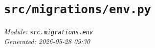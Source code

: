 
\section{\texttt{src/migrations/env.py}}
\textit{Module: \texttt{src.migrations.env}} \\
\textit{Generated: 2026-05-28 09:30} \\
